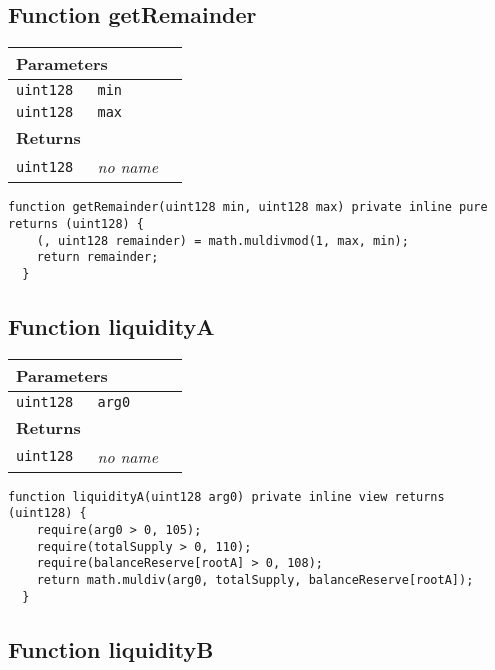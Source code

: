 \subsection{Function getRemainder}


\ifsoltables
\noindent\begin{tabular}{|l|l|p{5cm}|}\hline
\multicolumn{3}{|l|}{\bf Parameters}\\\hline
\tt uint128 & \tt min &\\\hline
\tt uint128 & \tt max &\\\hline
\multicolumn{3}{|l|}{\bf Returns}\\\hline
\tt uint128 & {\em no name} &\\\hline
\end{tabular}
\fi

\vspace{2cm}

\begin{lstlisting}[firstnumber=171]
  function getRemainder(uint128 min, uint128 max) private inline pure returns (uint128) {
    (, uint128 remainder) = math.muldivmod(1, max, min);
    return remainder;
  }
\end{lstlisting}

\subsection{Function liquidityA}


\ifsoltables
\noindent\begin{tabular}{|l|l|p{5cm}|}\hline
\multicolumn{3}{|l|}{\bf Parameters}\\\hline
\tt uint128 & \tt arg0 &\\\hline
\multicolumn{3}{|l|}{\bf Returns}\\\hline
\tt uint128 & {\em no name} &\\\hline
\end{tabular}
\fi

\vspace{2cm}

\begin{lstlisting}[firstnumber=191]
  function liquidityA(uint128 arg0) private inline view returns (uint128) {
    require(arg0 > 0, 105);
    require(totalSupply > 0, 110);
    require(balanceReserve[rootA] > 0, 108);
    return math.muldiv(arg0, totalSupply, balanceReserve[rootA]);
  }
\end{lstlisting}

\subsection{Function liquidityB}


